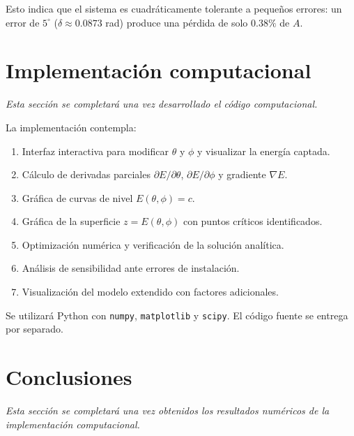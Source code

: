 \documentclass[12pt,a4paper]{article}
\begin{document}
Esto indica que el sistema es cuadráticamente tolerante a pequeños errores: un error de $5^\circ$ ($\delta\approx0.0873$ rad) produce una pérdida de solo $0.38\%$ de $A$.

\section{Implementación computacional}

\noindent\textit{Esta sección se completará una vez desarrollado el código computacional.}

La implementación contempla:
\begin{enumerate}
    \item Interfaz interactiva para modificar $\theta$ y $\phi$ y visualizar la energía captada.
    \item Cálculo de derivadas parciales $\partial E/\partial\theta$, $\partial E/\partial\phi$ y gradiente $\nabla E$.
    \item Gráfica de curvas de nivel $E(\theta,\phi)=c$.
    \item Gráfica de la superficie $z=E(\theta,\phi)$ con puntos críticos identificados.
    \item Optimización numérica y verificación de la solución analítica.
    \item Análisis de sensibilidad ante errores de instalación.
    \item Visualización del modelo extendido con factores adicionales.
\end{enumerate}

Se utilizará Python con \texttt{numpy}, \texttt{matplotlib} y \texttt{scipy}. El código fuente se entrega por separado.

\section{Conclusiones}

\noindent\textit{Esta secci\'on se completar\'a una vez obtenidos los resultados num\'ericos de la implementaci\'on computacional.}
\end{document}
